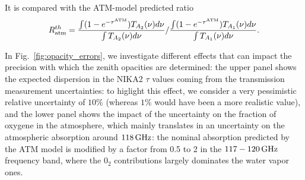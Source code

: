 It is compared with the ATM-model predicted ratio
\begin{equation}
  R_{\rm{atm}}^{th} = \frac{\int (1 - e^{-\tau^{\rm{ATM}}}) T_{A_2}(\nu) d\nu }{\int T_{A_2}(\nu) d\nu} / \frac{\int (1 -
      e^{-\tau^{\rm{ATM}}}) T_{A_{1}}(\nu) d\nu }{\int T_{A_1}(\nu)
        d\nu} .
      \label{eq:opacity_emission_ratio_model}
\end{equation}

In Fig.~\ref{fig:opacity_errors}, we investigate different effects that can impact the precision with
which the zenith opacities are determined: the upper panel shows the
expected dispersion in the NIKA2 $\tau$ values coming from the transmission
measurement uncertainties: to higlight this effect, we consider a very
pessimistic relative uncertainty of $10\%$ (whereas $1\%$ would have
been a more realistic value), and the lower panel shows the impact of the
uncertainty on the fraction of oxygene in the atmosphere, which mainly 
translates in an uncertainty on the atmospheric absorption around
$118\, \rm{GHz}$: the nominal absorption predicted by the ATM model is
modified by a factor from 0.5 to 2 in the $117-120\, \rm{GHz}$
frequency band, where the $0_2$ contributions largely dominates the
water vapor ones. 



